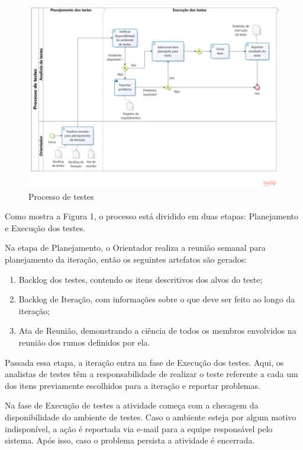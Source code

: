 \documentclass[
    12pt,               %
    openright,          %
    oneside,            %
    a4paper,            %
    section=TITLE,     %
    english,            %
    french,             %
    spanish,            %
    brazil              %
    ]{abntex2}
\begin{document}
\begin{figure}[htp]
\centering
\caption{Processo de testes}
\includegraphics[width=450px]{image1.png}
\end{figure}
\ifdefined\FloatBarrier \FloatBarrier \fi


Como mostra a Figura 1, o processo está dividido em duas etapas: Planejamento e Execução dos testes.


Na etapa de Planejamento, o Orientador realiza a reunião semanal para planejamento da iteração, então os seguintes artefatos são gerados:



\begin{enumerate}[start=1]
	
\item Backlog dos testes, contendo os itens descritivos dos alvos do teste;
	
\item Backlog de Iteração, com informações sobre o que deve ser feito ao longo da iteração;
	
\item Ata de Reunião, demonstrando a ciência de todos os membros envolvidos na reunião dos rumos definidos por ela.

\end{enumerate}

Passada essa etapa, a iteração entra na fase de Execução dos testes. Aqui, os analistas de testes têm a responsabilidade de realizar o teste referente a cada um dos itens previamente escolhidos para a iteração e reportar problemas.


Na fase de Execução de testes a atividade começa com a checagem da disponibilidade do ambiente de testes. Caso o ambiente esteja por algum motivo indisponível, a ação é reportada via e-mail para a equipe responsável pelo sistema. Após isso, caso o problema persista a atividade é encerrada.
\end{document}
